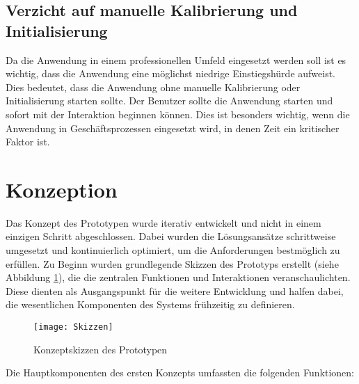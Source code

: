 \subsection{Verzicht auf manuelle Kalibrierung und Initialisierung}

Da die Anwendung in einem professionellen Umfeld eingesetzt werden soll ist es wichtig, dass die Anwendung eine möglichst niedrige Einstiegshürde aufweist. Dies bedeutet, dass die Anwendung ohne manuelle Kalibrierung oder Initialisierung starten sollte. Der Benutzer sollte die Anwendung starten und sofort mit der Interaktion beginnen können. Dies ist besonders wichtig, wenn die Anwendung in Geschäftsprozessen eingesetzt wird, in denen Zeit ein kritischer Faktor ist.

\section{Konzeption}

Das Konzept des Prototypen wurde iterativ entwickelt und nicht in einem einzigen Schritt abgeschlossen. Dabei wurden die Lösungsansätze schrittweise umgesetzt und kontinuierlich optimiert, um die Anforderungen bestmöglich zu erfüllen. Zu Beginn wurden grundlegende Skizzen des Prototyps erstellt (siehe Abbildung \ref{fig:Concept}), die die zentralen Funktionen und Interaktionen veranschaulichten. Diese dienten als Ausgangspunkt für die weitere Entwicklung und halfen dabei, die wesentlichen Komponenten des Systems frühzeitig zu definieren.

\begin{figure}[ht]
    \centering
    \texttt{[image: Skizzen]}
    \caption{Konzeptskizzen des Prototypen}
    \label{fig:Concept}
\end{figure}

Die Hauptkomponenten des ersten Konzepts umfassten die folgenden Funktionen:

